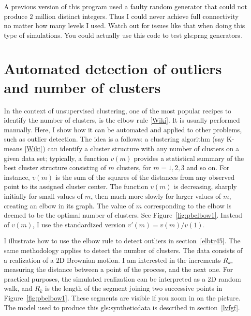 \documentclass[oneside,10pt]{book}
\begin{document}
\noindent A previous version of this program used a faulty random generator that could not produce $2$ million distinct integers.
Thus I could never achieve full connectivity no matter how many levels I used. Watch out for issues like that when doing this type of simulations. You could actually use
 this code to test \gls{gls:prng} generators.


\section{Automated detection of outliers and number of clusters}\label{bbcl}

In the context of unsupervised clustering, one of the most popular recipes to identify the number of clusters, is the
\textcolor{index}{elbow rule} [\href{https://en.wikipedia.org/wiki/Elbow_method_(clustering)}{Wiki}]. It is usually performed manually. Here, I show how it can be automated and applied to other problems, such as outlier detection. The idea is a follows: a clustering algorithm (say K-means
[\href{https://en.wikipedia.org/wiki/K-means_clustering}{Wiki}]) can identify a cluster structure with any number of clusters on a given data set; typically, a function $v(m)$ provides a statistical summary of the best cluster structure consisting of $m$ clusters, for $m=1,2,3$ and so on. For instance, $v(m)$ is the sum of the squares of the distances from any observed point to its assigned cluster center.
The function $v(m)$ is decreasing, sharply initially for small values of $m$, then much more slowly for larger values of $m$, creating an elbow in its graph.  The value of $m$ corresponding to the elbow is deemed to be the optimal number of clusters. See Figure~\ref{fig:pbelbow1}. Instead of $v(m)$, I use the standardized version $v'(m)=v(m)/v(1)$.

I illustrate how to use the elbow rule to detect \textcolor{index}{outliers} in section~\ref{elbtr45}. The same methodology applies to detect the number of clusters.
 The data consists of a realization of a 2D Brownian motion. I am interested in the increments $R_k$, measuring the distance between
 a point of the process, and the next one. For practical purposes, the simulated realization can be interpreted as a 2D random walk, and $R_k$ is the length of the segment joining two successive points in Figure~\ref{fig:pbelbow1}. These segments are visible if you zoom in on the picture. The model used to produce this \gls{gls:syntheticdata} is described in section~\ref{lvfgf}.
\end{document}
